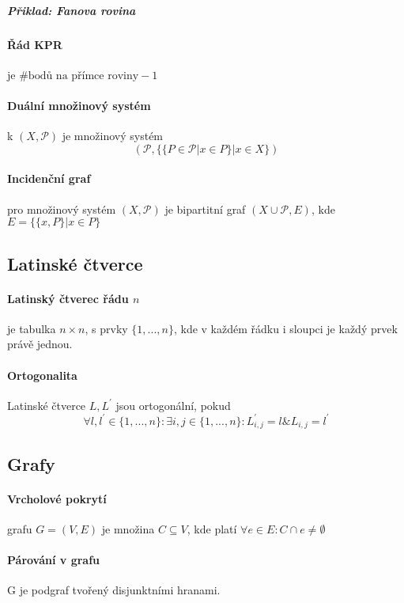\documentclass[10pt,a4paper]{article}
\theoremstyle{plain}
\begin{document}
\subparagraph{Přiklad: Fanova rovina}

\paragraph{Řád KPR} je $\# \text{bodů na přímce roviny} - 1$
\paragraph{Duální množinový systém} k $(X, \mathcal{P})$ je množinový systém 
\[ (\mathcal{P}, \{ \{ P \in \mathcal{P} | x \in P  \} | x \in X\})\]
\paragraph{Incidenční graf} pro množinový systém $(X, \mathcal{P})$ je bipartitní graf 
$(X \cup \mathcal{P}, E)$, kde $E = \{ \{ x, P \} | x \in P \}$

\subsection{Latinské čtverce}

\paragraph{Latinský čtverec řádu $n$} je tabulka $n \times n$,  s prvky $\{1,...,n\}$, kde v každém řádku i sloupci je každý prvek právě jednou.

\paragraph{Ortogonalita} Latinské čtverce $L, L^\prime$ jsou ortogonální, pokud \[ \forall l, l^\prime \in \{1,...,n\}: \exists i,j \in \{1,...,n\}: L_{i,j}^\prime = l \& L_{i,j} = l^\prime \]

\subsection{Grafy}

\paragraph{Vrcholové pokrytí} grafu $G = (V,E)$ je množina $C \subseteq V$, kde platí
$\forall e \in E: C \cap e \neq \emptyset$

\paragraph{Párování v grafu} G je podgraf tvořený disjunktními hranami.
\end{document}
